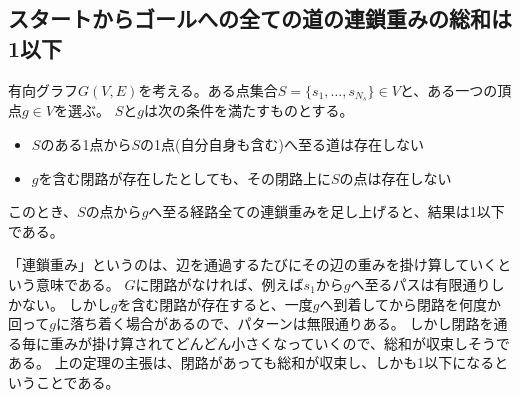         \subsection{スタートからゴールへの全ての道の連鎖重みの総和は1以下}
            \begin{shadebox}
                有向グラフ$G(V,E)$を考える。ある点集合$S = \{s_1,\dotsc,s_{N_s}\}\in V$と、ある一つの頂点$g\in V$を選ぶ。
                $S$と$g$は次の条件を満たすものとする。
                \begin{itemize}
                    \item $S$のある1点から$S$の1点(自分自身も含む)へ至る道は存在しない
                    \item $g$を含む閉路が存在したとしても、その閉路上に$S$の点は存在しない
                \end{itemize}
                このとき、$S$の点から$g$へ至る経路全ての連鎖重みを足し上げると、結果は1以下である。
            \end{shadebox}
            「連鎖重み」というのは、辺を通過するたびにその辺の重みを掛け算していくという意味である。
            $G$に閉路がなければ、例えば$s_1$から$g$へ至るパスは有限通りしかない。
            しかし$g$を含む閉路が存在すると、一度$g$へ到着してから閉路を何度か回って$g$に落ち着く場合があるので、パターンは無限通りある。
            しかし閉路を通る毎に重みが掛け算されてどんどん小さくなっていくので、総和が収束しそうである。
            上の定理の主張は、閉路があっても総和が収束し、しかも1以下になるということである。
